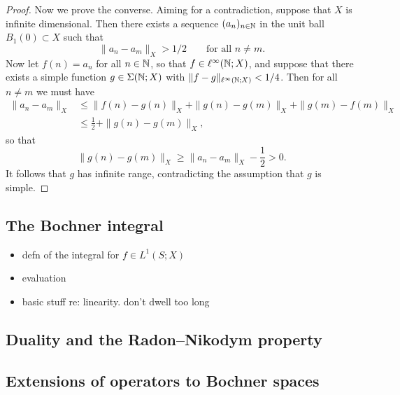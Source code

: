 \begin{proof}
  Now we prove the converse.
  Aiming for a contradiction, suppose that $X$ is infinite dimensional.
  Then there exists a sequence $(a_n)_{n \in \mathbb{N}}$ in the unit ball $B_1(0) \subset X$ such that
  \begin{equation*}
    \|a_n - a_m\|_X > 1/2 \qquad \text{for all $n \neq m$.}
  \end{equation*}
  Now let $f(n) = a_n$ for all $n \in \mathbb{N}$, so that $f \in \ell^\infty(\mathbb{N};X)$, and suppose that there exists a simple function $g \in \Sigma(\mathbb{N};X)$ with $\|f - g\|_{\ell^\infty(\mathbb{N};X)} < 1/4$.
  Then for all $n \neq m$ we must have
  \begin{equation*}
    \begin{aligned}
      \|a_n - a_m\|_X &\leq \|f(n) - g(n)\|_X + \|g(n) - g(m)\|_X + \|g(m) - f(m)\|_X \\
      &\leq \frac{1}{2} + \|g(n) - g(m)\|_X,
    \end{aligned}
  \end{equation*}
  so that
  \begin{equation*}
    \|g(n) - g(m)\|_X \geq \|a_n - a_m\|_X - \frac{1}{2} > 0.
  \end{equation*}
  It follows that $g$ has infinite range, contradicting the assumption that $g$ is simple.
\end{proof}

\subsection{The Bochner integral}

\begin{itemize}
\item defn of the integral for $f \in L^1(S;X)$
\item evaluation
\item basic stuff re: linearity. don't dwell too long
\end{itemize}




\subsection{Duality and the Radon--Nikodym property}



\subsection{Extensions of operators to Bochner spaces}

